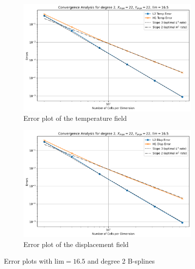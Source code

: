 \documentclass[a4paper,12pt,twoside]{report}
\begin{document}
\begin{figure}[!h]
	\begin{subfigure}[b]{0.49\textwidth}
		\centering
		\includegraphics[width=\textwidth]{figures/figures_thermoelas/Temp_X_max=22_Y_max=22_lim=16.5_d=2.png}
		\caption{Error plot of the temperature field}
		\label{fig:error_temp_d2_lim_16_5}
	\end{subfigure}
	\begin{subfigure}[b]{0.49\textwidth}
		\centering
		\includegraphics[width=\textwidth]{figures/figures_thermoelas/Disp_X_max=22_Y_max=22_lim=16.5_d=2_disp.png}
		\caption{Error plot of the displacement field}
		\label{fig:error_disp_d2_lim_16_5}
	\end{subfigure}
	\caption{Error plots with $\text{lim} = 16.5$ and degree 2 B-splines}
\end{figure}
\end{document}
